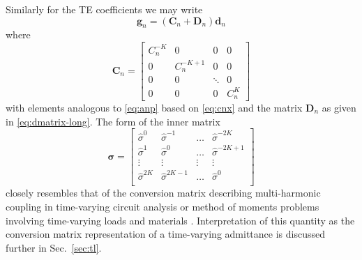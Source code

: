\documentclass[article]{IEEEtran}
\newcommand{\M}[1]{\mathbf{#1}}
\newcommand{\V}[1]{\boldsymbol{#1}}
\newcommand{\bs}[1]{\boldsymbol{\V{#1}}}
\begin{document}
\setcounter{equation}{42}
Similarly for the TE coefficients we may write
\begin{equation}
    \M{g}_n = \left(\M{C}_n + \M{D}_n\right)\M{d}_n
    \label{eq:g-vector-te}
\end{equation}
where
\begin{equation}
    \M{C}_n = \begin{bmatrix}
    C_n^{-K} & 0 & 0 & 0 \\
    0 & C_n^{-K+1} & 0 & 0\\
    0 & 0 & \ddots & 0\\
    0 & 0 & 0 & C_n^K
    \end{bmatrix}
\end{equation}
\setcounter{equation}{44}
with elements analogous to \eqref{eq:anp} based on \eqref{eq:cnx} and the matrix $\M{D}_n$ as given in \eqref{eq:dmatrix-long}.  The form of the inner matrix
\begin{equation}
    \bs{\sigma} = \begin{bmatrix}
    \hat{\sigma}^{0} &  \hat{\sigma}^{-1} & \hdots & \hat{\sigma}^{-2K} \\
    \hat{\sigma}^{1} &  \hat{\sigma}^0 & \hdots & \hat{\sigma}^{-2K+1} \\
    \vdots & \vdots & \vdots & \vdots\\
    \hat{\sigma}^{2K} &  \hat{\sigma}^{2K-1} & \hdots & \hat{\sigma}^0 \\
    \end{bmatrix}
\end{equation}
closely resembles that of the conversion matrix describing multi-harmonic coupling in time-varying circuit analysis \cite{maas2003nonlinear} or method of moments problems involving time-varying loads and materials \cite{bass2021conversion}.  Interpretation of this quantity as the conversion matrix representation of a time-varying admittance is discussed further in Sec.~\ref{sec:tl}.
\end{document}
